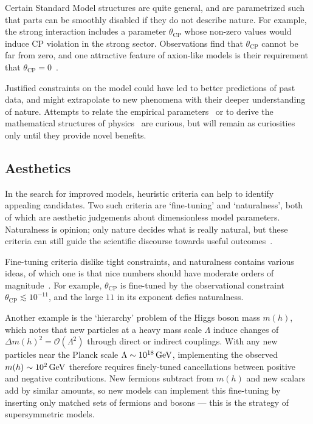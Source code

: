 Certain Standard Model structures are quite general, and are parametrized such
that parts can be smoothly disabled if they do not describe nature.
For example, the strong interaction includes a parameter $\theta_\mathrm{CP}$
whose non-zero values would induce $\mathrm{CP}$ violation in the strong
sector.
Observations find that $\theta_\mathrm{CP}$ cannot be far from zero, and one
attractive feature of axion-like models is their requirement that
$\theta_\mathrm{CP} = 0$~\cite{
kim2008axions,
thomson2013modern,
martin2017particle
}.

Justified constraints on the model could have led to better predictions of
past data, and might extrapolate to new phenomena with their deeper
understanding of nature.
Attempts to relate the empirical parameters~\cite{
sato1979ratio,
beg1982gauge,
koide1983fermion,
denterria2012gaussian
}
or to derive the mathematical structures of physics~\cite{
goyal2010origin,
skilling2021abc,
axioms1010038
}
are curious, but will remain as curiosities only until they provide novel
benefits.


\subsection{Aesthetics}
In the search for improved models, heuristic criteria can help to identify
appealing candidates.
Two such criteria are `fine-tuning' and `naturalness', both of which are
aesthetic judgements about dimensionless model parameters.
Naturalness is opinion; only nature decides what is really natural,
but these criteria can still guide the scientific discourse towards useful
outcomes~\cite{wells2020discovery}.

Fine-tuning criteria dislike tight constraints, and naturalness contains
various ideas, of which one is that nice numbers should have moderate orders of
magnitude~\cite{giudice2008naturally}.
For example, $\theta_\mathrm{CP}$ is fine-tuned by the observational constraint
$\theta_\mathrm{CP} \lesssim 10^{-11}$, and the large $11$ in its exponent
defies naturalness.

Another example is the `hierarchy' problem of the Higgs boson mass $m(h)$,
which notes that new particles at a heavy mass scale $\Lambda$ induce changes
of $\Delta m(h)^2 = \mathcal{O}(\Lambda^2)$
through direct or indirect couplings.
With any new particles near the Planck scale $\Lambda \sim 10^{18}\,\eV[G]$,
implementing the observed $m(h) \sim 10^{2}\,\eV[G]$ therefore requires
finely-tuned cancellations between positive and negative contributions.
New fermions subtract from $m(h)$ and new scalars add by similar amounts,
so new models can implement this fine-tuning by inserting only matched sets of
fermions and bosons --- this is the strategy of supersymmetric models.


